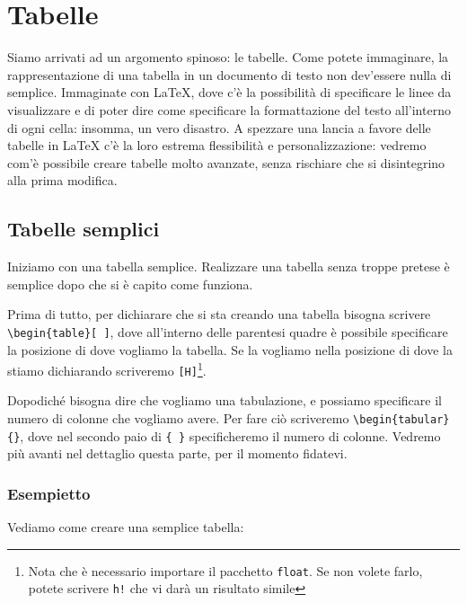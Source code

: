 \section{Tabelle}

Siamo arrivati ad un argomento spinoso: le tabelle. Come potete immaginare, la
rappresentazione di una tabella in un documento di testo non dev'essere nulla
di semplice. Immaginate con \LaTeX{}, dove c'è la possibilità di specificare le
linee da visualizzare e di poter dire come specificare la formattazione del
testo all'interno di ogni cella: insomma, un vero disastro.
A spezzare una lancia a favore delle tabelle in \LaTeX{} c'è la loro estrema
flessibilità e personalizzazione: vedremo com'è possibile creare tabelle molto
avanzate, senza rischiare che si disintegrino alla prima modifica.

\subsection{Tabelle semplici}

Iniziamo con una tabella semplice. Realizzare una tabella senza troppe pretese
è semplice dopo che si è capito come funziona.

Prima di tutto, per dichiarare che si sta creando una tabella bisogna scrivere
\verb!\begin{table}[ ]!, dove all'interno delle parentesi quadre è possibile
specificare la posizione di dove vogliamo la tabella. Se la vogliamo nella
posizione di dove la stiamo dichiarando scriveremo \verb![H]!\footnote{Nota
che è necessario importare il pacchetto \texttt{float}. Se non volete farlo,
potete scrivere \texttt{h!} che vi darà un risultato simile}.

Dopodiché bisogna dire che vogliamo una tabulazione, e possiamo specificare il
numero di colonne che vogliamo avere. Per fare ciò scriveremo
\verb!\begin{tabular}{}!, dove nel secondo paio di \verb!{ }! specificheremo il
numero di colonne. Vedremo più avanti nel dettaglio questa parte, per il
momento fidatevi.

\vspace{\abovedisplayskip}
\begin{minipage}{\linewidth}
  \subsubsection{Esempietto}

  Vediamo come creare una semplice tabella:
  


\end{minipage}
\vspace{\belowdisplayskip}


